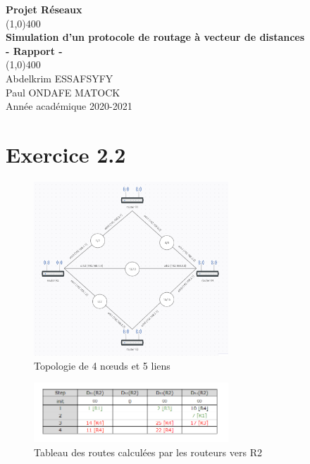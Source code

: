 \documentclass[11pt]{article}
\begin{document}
\begin{titlepage}
\begin{center}
\vspace*{1cm}
\Large{\textbf{Projet Réseaux}}\\
\vfill
\line(1,0){400}\\[1mm]
\huge{\textbf{Simulation d'un protocole de routage à vecteur de distances}}\\[3mm]
\Large{\textbf{- Rapport -}}\\[1mm]
\line(1,0){400}\\
\vfill
Abdelkrim ESSAFSYFY\\
Paul ONDAFE MATOCK\\
Année académique 2020-2021
\end{center}
\end{titlepage}

\tableofcontents
\thispagestyle{empty}
\clearpage
\setcounter{page}{1}

\section{Exercice 2.2}
\begin{figure} [h!]
\centering
  \includegraphics[width=0.65\textwidth]{../documents/topology-figure.png}
  \caption{Topologie de 4 nœuds et 5 liens}
   \label{fig:topology}
\end{figure}
\begin{figure} [h!]
\centering
  \includegraphics[width=0.65\textwidth]{../documents/demo-table.png}
  \caption{Tableau des routes calculées par les routeurs vers R2}
   \label{fig:table}
\end{figure}
\end{document}
